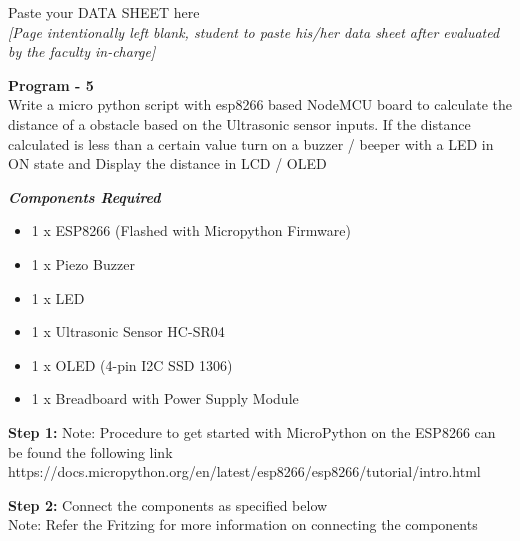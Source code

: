 \documentclass[12pt,a4paper]{article}
\begin{document}
Paste your DATA SHEET here\\
\textit{[Page intentionally left blank, student to paste his/her data sheet after evaluated by the faculty in-charge] }
\clearpage
\begin{center}
{\large {\textbf{Program - 5}}\\
Write a micro python script with esp8266 based NodeMCU board to calculate the distance of a obstacle based on the Ultrasonic sensor inputs. If the distance calculated is less than a certain value turn on a buzzer / beeper with a LED in ON state and Display the distance in LCD / OLED}
\end{center}
\begin{flushleft}
\textbf{\textit{Components Required}}
\begin{itemize}[noitemsep,nolistsep]
\item 1 x ESP8266 (Flashed with Micropython Firmware)
\item 1 x Piezo Buzzer
\item 1 x LED
\item 1 x Ultrasonic Sensor HC-SR04
\item 1 x OLED (4-pin I2C SSD 1306)
\item 1 x Breadboard with Power Supply Module
\end{itemize}
\vspace{5mm}

\textbf{Step 1:} Note: Procedure to get started with MicroPython on the ESP8266 can be found the following link \\
https://docs.micropython.org/en/latest/esp8266/esp8266/tutorial/intro.html
\vspace{5mm}

\textbf{Step 2:} Connect the components as specified below\\
Note: Refer the Fritzing for more information on connecting the components
\vspace{5mm}


\end{flushleft}
\end{document}
